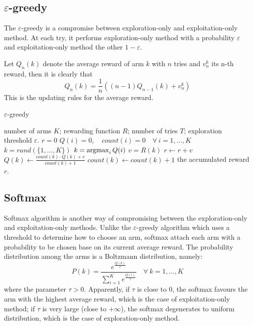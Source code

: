 \subsection{$\varepsilon$-greedy}
The $\varepsilon$-greedy is a compromise between exploration-only and exploitation-only method. At
each try, it performs exploration-only method with a probability $\varepsilon$ and exploitation-only method
the other $1 - \varepsilon$.\par
Let $Q_n(k)$ denote the average reward of arm $k$ with $n$ tries and $v_n^k$ its n-th reward, then it is 
clearly that
$$Q_n(k) = \frac{1}{n} ((n-1)Q_{n-1}(k) + v_n^k)$$
This is the updating rules for the average reward.

\begin{algorithm}
    \caption{$\varepsilon$-greedy}\label{epsilon_greedy_for_K_arm_bandit}
    \begin{algorithmic}[1]
        \Require number of arms $K$; rewarding function $R$; number of tries $T$; exploration threshold 
        $\varepsilon$.
        \State $r = 0$
        \State $Q(i) = 0, \quad count(i) = 0 \quad \forall~i=1,\ldots,K$
                \State $k = rand(\{1, \ldots, K\})$
            \Else
                \State $k = \operatorname*{argmax}_i Q(i)$
            \EndIf
            \State $v = R(k)$
            \State $r \gets r + v$
            \State $Q(k) \gets \frac{count(k) \cdot Q(k) + v}{count(k) + 1}$
            \State $count(k) \gets count(k) + 1$
        \EndFor
        \Ensure the accumulated reward $r$.
    \end{algorithmic}
\end{algorithm}


\subsection{Softmax}
Softmax algorithm is another way of compromising between the exploration-only and exploitation-only methods. 
Unlike the $\varepsilon$-greedy algorithm which uses a threshold to determine how to choose an arm, softmax 
attach each arm with a probability to be chosen base on its current average reward. The probability 
distribution among the arms is a Boltzmann distribution, namely:
\begin{equation}\label{K_arm_bandit_softmax}
P(k) = \frac{e^{\frac{Q(k)}{\tau}}}{\sum_{i=1}^K e^{\frac{Q(i)}{\tau}}}\quad\forall~k = 1,\ldots,K
\end{equation}
where the parameter $\tau > 0$. Apparently, if $\tau$ is close to $0$, the softmax favours the arm with
the highest average reward, which is the case of exploitation-only method; if $\tau$ is very large (close to 
$+\infty$), the softmax degenerates to uniform distribution, which is the case of exploration-only method.

